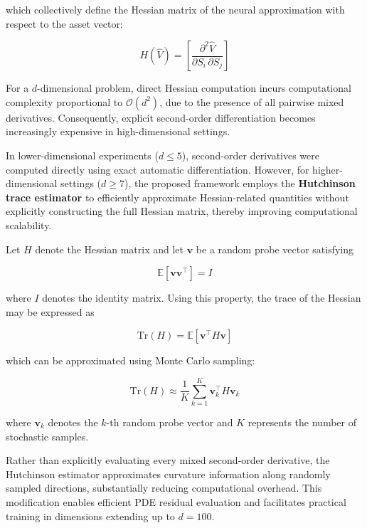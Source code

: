 \documentclass[12pt, a4paper]{article}
\begin{document}
which collectively define the Hessian matrix of the neural approximation
with respect to the asset vector:

\begin{equation}
    H(\hat{V}) = \left[
        \frac{\partial^2\hat{V}}{\partial S_i\,\partial S_j}
    \right]
    \label{eq:hessian}
\end{equation}

For a $d$-dimensional problem, direct Hessian computation incurs
computational complexity proportional to $\mathcal{O}(d^2)$, due to
the presence of all pairwise mixed derivatives. Consequently, explicit
second-order differentiation becomes increasingly expensive in
high-dimensional settings.

In lower-dimensional experiments ($d \leq 5$), second-order derivatives
were computed directly using exact automatic differentiation. However,
for higher-dimensional settings ($d \geq 7$), the proposed framework
employs the \textbf{Hutchinson trace estimator} to efficiently
approximate Hessian-related quantities without explicitly constructing
the full Hessian matrix, thereby improving computational scalability.

Let $H$ denote the Hessian matrix and let $\mathbf{v}$ be a random
probe vector satisfying

\begin{equation}
    \mathbb{E}[\mathbf{v}\mathbf{v}^\top] = I
    \label{eq:probe_vector}
\end{equation}

where $I$ denotes the identity matrix. Using this property, the trace
of the Hessian may be expressed as

\begin{equation}
    \mathrm{Tr}(H) = \mathbb{E}[\mathbf{v}^\top H\mathbf{v}]
    \label{eq:hutchinson_exact}
\end{equation}

which can be approximated using Monte Carlo sampling:

\begin{equation}
    \mathrm{Tr}(H) \approx \frac{1}{K}\sum_{k=1}^{K}
    \mathbf{v}_k^\top H\mathbf{v}_k
    \label{eq:hutchinson_approx}
\end{equation}

where $\mathbf{v}_k$ denotes the $k$-th random probe vector and $K$
represents the number of stochastic samples.

Rather than explicitly evaluating every mixed second-order derivative,
the Hutchinson estimator approximates curvature information along
randomly sampled directions, substantially reducing computational
overhead. This modification enables efficient PDE residual evaluation
and facilitates practical training in dimensions extending up to
$d = 100$.
\end{document}
